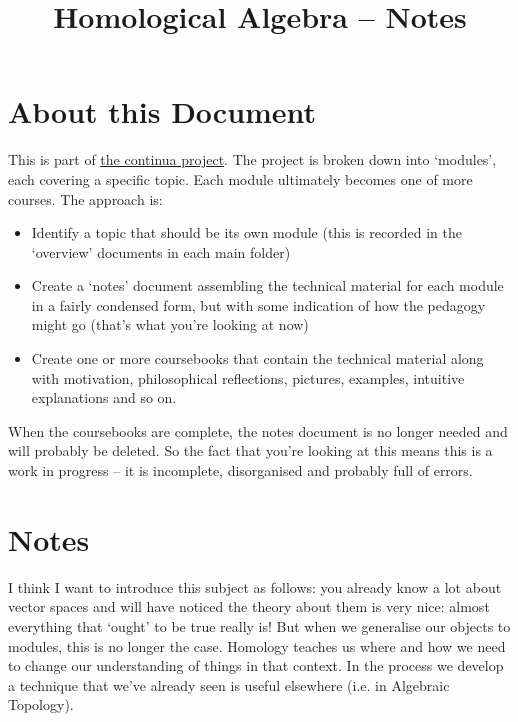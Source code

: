 \documentclass[oneside,english]{amsbook}
\numberwithin{section}{chapter}
\theoremstyle{plain}
\theoremstyle{definition}
\begin{document}
	
	\title{Homological Algebra -- Notes}
	
	\maketitle
	
	\tableofcontents
	
	\chapter*{About this Document}
	
	This is part of \href{https://github.com/FineArtMaths/continua}{the continua project}. The project is broken down into `modules', each covering a specific topic. Each module ultimately becomes one of more courses. The approach is:
	
	\begin{itemize}
		\item{Identify a topic that should be its own module (this is recorded in the `overview' documents in each main folder)}
		\item{Create a `notes' document assembling the technical material for each module in a fairly condensed form, but with some indication of how the pedagogy might go (that's what you're looking at now)}
		\item{Create one or more coursebooks that contain the technical material along with motivation, philosophical reflections, pictures, examples, intuitive explanations and so on.}
	\end{itemize}
	
	When the coursebooks are complete, the notes document is no longer needed and will probably be deleted. So the fact that you're looking at this means this is a work in progress -- it is incomplete, disorganised and probably full of errors.

	\chapter*{Notes}
	
		I think I want to introduce this subject as follows: you already know a lot about vector spaces and will have noticed the theory about them is very nice: almost everything that `ought' to be true really is! But when we generalise our objects to modules, this is no longer the case. Homology teaches us where and how we need to change our understanding of things in that context. In the process we develop a technique that we've already seen is useful elsewhere (i.e. in Algebraic Topology).
		
\end{document}

